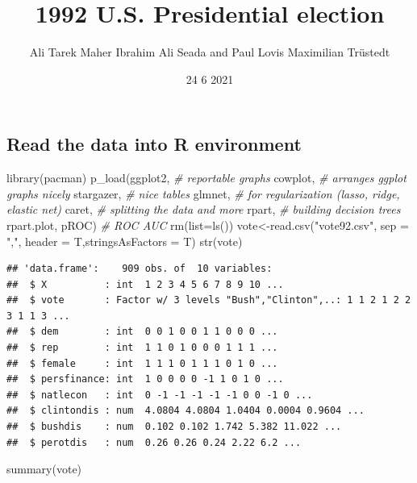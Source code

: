 \documentclass[
]{article}
\title{1992 U.S. Presidential election}
\author{Ali Tarek Maher Ibrahim Ali Seada and Paul Lovis Maximilian
Trüstedt}
\date{24 6 2021}
\newenvironment{Shaded}{\begin{snugshade}}{\end{snugshade}}
\newcommand{\AttributeTok}[1]{\textcolor[rgb]{0.77,0.63,0.00}{#1}}
\newcommand{\CommentTok}[1]{\textcolor[rgb]{0.56,0.35,0.01}{\textit{#1}}}
\newcommand{\FunctionTok}[1]{\textcolor[rgb]{0.00,0.00,0.00}{#1}}
\newcommand{\NormalTok}[1]{#1}
\newcommand{\OtherTok}[1]{\textcolor[rgb]{0.56,0.35,0.01}{#1}}
\newcommand{\StringTok}[1]{\textcolor[rgb]{0.31,0.60,0.02}{#1}}
\begin{document}
\maketitle

\hypertarget{read-the-data-into-r-environment}{%
\subsection{Read the data into R
environment}\label{read-the-data-into-r-environment}}

\begin{Shaded}
\begin{Highlighting}[]
\FunctionTok{library}\NormalTok{(pacman)}
\FunctionTok{p\_load}\NormalTok{(ggplot2,   }\CommentTok{\# reportable graphs }
\NormalTok{       cowplot,   }\CommentTok{\# arranges ggplot graphs nicely}
\NormalTok{       stargazer, }\CommentTok{\# nice tables}
\NormalTok{       glmnet, }\CommentTok{\# for regularization (lasso, ridge, elastic net)}
\NormalTok{       caret,       }\CommentTok{\#  splitting the data and more}
\NormalTok{       rpart,       }\CommentTok{\#  building decision trees }
\NormalTok{       rpart.plot,}
\NormalTok{       pROC)      }\CommentTok{\# ROC AUC}
\FunctionTok{rm}\NormalTok{(}\AttributeTok{list=}\FunctionTok{ls}\NormalTok{())}
\NormalTok{vote}\OtherTok{\textless{}{-}}\FunctionTok{read.csv}\NormalTok{(}\StringTok{"vote92.csv"}\NormalTok{, }\AttributeTok{sep =} \StringTok{","}\NormalTok{, }\AttributeTok{header =}\NormalTok{ T,}\AttributeTok{stringsAsFactors =}\NormalTok{ T)}
\FunctionTok{str}\NormalTok{(vote)}
\end{Highlighting}
\end{Shaded}

\begin{verbatim}
## 'data.frame':    909 obs. of  10 variables:
##  $ X          : int  1 2 3 4 5 6 7 8 9 10 ...
##  $ vote       : Factor w/ 3 levels "Bush","Clinton",..: 1 1 2 1 2 2 3 1 1 3 ...
##  $ dem        : int  0 0 1 0 0 1 1 0 0 0 ...
##  $ rep        : int  1 1 0 1 0 0 0 1 1 1 ...
##  $ female     : int  1 1 1 0 1 1 1 0 1 0 ...
##  $ persfinance: int  1 0 0 0 0 -1 1 0 1 0 ...
##  $ natlecon   : int  0 -1 -1 -1 -1 -1 0 0 -1 0 ...
##  $ clintondis : num  4.0804 4.0804 1.0404 0.0004 0.9604 ...
##  $ bushdis    : num  0.102 0.102 1.742 5.382 11.022 ...
##  $ perotdis   : num  0.26 0.26 0.24 2.22 6.2 ...
\end{verbatim}

\begin{Shaded}
\begin{Highlighting}[]
\FunctionTok{summary}\NormalTok{(vote)}
\end{Highlighting}
\end{Shaded}
\end{document}
